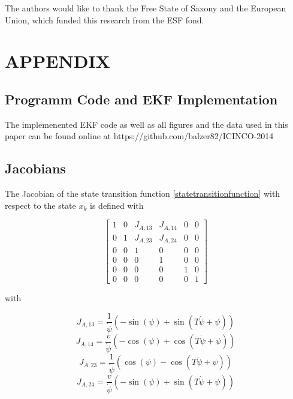\documentclass[a4paper,twoside]{article}
\begin{document}
\noindent The authors would like to thank the Free State of Saxony and the European Union, which funded this research from the ESF fond.



{\small
}


\section*{\uppercase{Appendix}}

\noindent \subsection*{Programm Code and EKF Implementation}
The implemenented EKF code as well as all figures and the data used in this paper can be found online at https://github.com/balzer82/ICINCO-2014

\subsection*{Jacobians}

The Jacobian of the state transition function \eqref{statetransitionfunction} with respect to the state $x_k$ is defined with

\begin{equation}\left[\begin{matrix}1 & 0 & J_{A,13} & J_{A,14} & 0 & 0\\0 & 1 & J_{A,23} & J_{A,24} & 0 & 0\\0 & 0 & 1 & 0 & 0 & 0\\0 & 0 & 0 & 1 & 0 & 0\\0 & 0 & 0 & 0 & 1 & 0\\0 & 0 & 0 & 0 & 0 & 1\end{matrix}\right]\end{equation}

with

\begin{equation}J_{A,13}=\frac{1}{\dot\psi} \left(- \sin{\left (\psi \right )} + \sin{\left (T \dot\psi + \psi \right )}\right)\end{equation}
\begin{equation}J_{A,14}=\frac{v}{\dot\psi} \left(- \cos{\left (\psi \right )} + \cos{\left (T \dot\psi + \psi \right )}\right)\end{equation}
\begin{equation}J_{A,23}=\frac{1}{\dot\psi} \left(\cos{\left (\psi \right )} - \cos{\left (T \dot\psi + \psi \right )}\right)\end{equation}
\begin{equation}J_{A,24}=\frac{v}{\dot\psi} \left(- \sin{\left (\psi \right )} + \sin{\left (T \dot\psi + \psi \right )}\right)\end{equation}
\end{document}
